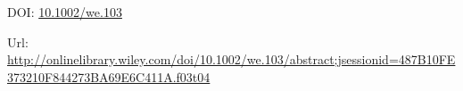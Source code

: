 \documentclass[a4paper,12pt]{article}
\newcommand{\doi}[1]{DOI: \href{http://dx.doi.org/#1}{#1}}
\begin{document}
\thispagestyle{empty}

\vspace{3cm}

\nocite{FDB-art-6}
\printbibliography

\vspace{3cm}
\doi{10.1002/we.103}

\vspace{1.5cm}
Url: \url{http://onlinelibrary.wiley.com/doi/10.1002/we.103/abstract;jsessionid=487B10FE373210F844273BA69E6C411A.f03t04}

\newpage

\end{document}
